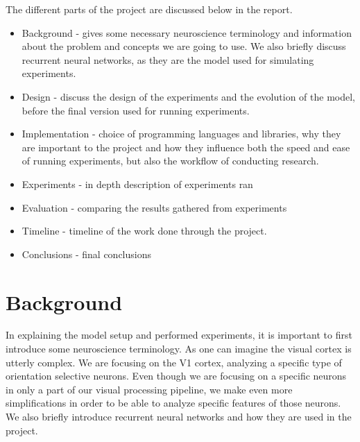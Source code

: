 The different parts of the project are discussed below in the report.
\begin{itemize}
  \item Background - gives some necessary neuroscience terminology and information about the problem and concepts we are going to use. We also briefly discuss recurrent neural networks, as they are the model used for simulating experiments.
  \item Design - discuss the design of the experiments and the evolution of the model, before the final version used for running experiments.
  \item Implementation - choice of programming languages and libraries, why they are important to the project and how they influence both the speed and ease of running experiments, but also the workflow of conducting research.
  \item Experiments - in depth description of experiments ran
  \item Evaluation - comparing the results gathered from experiments
  \item Timeline - timeline of the work done through the project.
  \item Conclusions - final conclusions
\end{itemize}





\chapter{Background}

In explaining the model setup and performed experiments, it is important to first introduce some neuroscience terminology. As one can imagine the visual cortex is utterly complex. We are focusing on the V1 cortex, analyzing a specific type of orientation selective neurons. Even though we are focusing on a specific neurons in only a part of our visual processing pipeline, we make even more simplifications in order to be able to analyze specific features of those neurons. We also briefly introduce recurrent neural networks and how they are used in the project.

